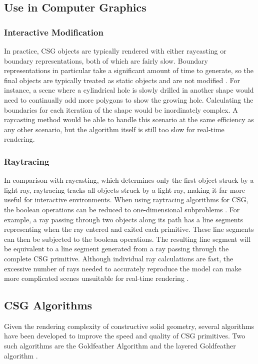 \documentclass[12pt]{article}
\begin{document}
\begin{doublespace}
\subsection{Use in Computer Graphics}
\subsubsection{Interactive Modification}
In practice, CSG objects are typically rendered with either raycasting or boundary representations, both of which are fairly slow. Boundary representations in particular take a significant amount of time to generate, so the final objects are typically treated as static objects and are not modified \cite{advanced_opengl}. For instance, a scene where a cylindrical hole is slowly drilled in another shape would need to continually add more polygons to show the growing hole. Calculating the boundaries for each iteration of the shape would be inordinately complex. A raycasting method would be able to handle this scenario at the same efficiency as any other scenario, but the algorithm itself is still too slow for real-time rendering.
\subsubsection{Raytracing}
In comparison with raycasting, which determines only the first object struck by a light ray, raytracing tracks all objects struck by a light ray, making it far more useful for interactive environments. When using raytracing algorithms for CSG, the boolean operations can be reduced to one-dimensional subproblems \cite{raytrace}. For example, a ray passing through two objects along its path has a line segments representing when the ray entered and exited each primitive. These line segments can then be subjected to the boolean operations. The resulting line segment will be equivalent to a line segment generated from a ray passing through the complete CSG primitive. Although individual ray calculations are fast, the excessive number of rays needed to accurately reproduce the model can make more complicated scenes unsuitable for real-time rendering \cite{interactive_csg}.
\subsection{CSG Algorithms}
Given the rendering complexity of constructive solid geometry, several algorithms have been developed to improve the speed and quality of CSG primitives. Two such algorithms are the Goldfeather Algorithm and the layered Goldfeather algorithm \cite{hardware_csg}.

\end{doublespace}
\end{document}
